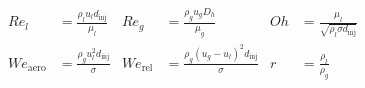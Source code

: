 


\begin{equation}
\label{eq:dimensionless_numbers_jicf}
\begin{aligned}
Re_l &= \frac{\rho_l u_l d_\mathrm{inj}}{\mu_l}          &  Re_g &= \frac{\rho_g u_g D_h}{\mu_g}              &  Oh &=  \frac{\mu_l}{\sqrt{\rho_l \sigma d_\mathrm{inj}}}\\
We_\mathrm{aero} &= \frac{\rho_g u_l^2 d_\mathrm{inj}}{\sigma}    &  We_\mathrm{rel} &= \frac{\rho_g \left( u_g - u_l \right)^2 d_\mathrm{inj}}{\sigma}          & r &= \frac{\rho_l}{\rho_g} 
\end{aligned}
\end{equation}

\clearpage

